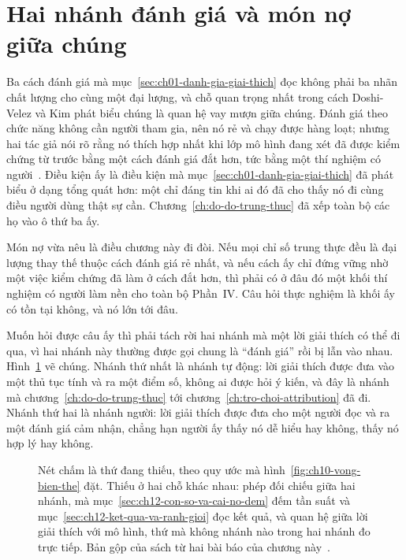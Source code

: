 \section{Hai nhánh đánh giá và món nợ giữa chúng}
\label{sec:ch12-hai-nhanh-danh-gia}

%
%
Ba cách đánh giá mà mục~\ref{sec:ch01-danh-gia-giai-thich} đọc không phải ba
nhãn chất lượng cho cùng một đại lượng, và chỗ quan trọng nhất trong cách
Doshi-Velez và Kim phát biểu chúng là quan hệ vay mượn giữa chúng. Đánh giá
theo chức năng không cần người tham gia, nên nó rẻ và chạy được hàng loạt;
nhưng hai tác giả nói rõ rằng nó thích hợp nhất khi lớp mô hình đang xét đã
được kiểm chứng từ trước bằng một cách đánh giá đắt hơn, tức bằng một thí
nghiệm có người~\autocite{p14rigorous}. Điều kiện ấy là điều kiện mà
mục~\ref{sec:ch01-danh-gia-giai-thich} đã phát biểu ở dạng tổng quát hơn: một
 chỉ đáng tin khi ai đó đã cho thấy nó đi cùng
điều người dùng thật sự cần.
Chương~\ref{ch:do-do-trung-thuc} đã xếp toàn bộ các họ  vào ô
thứ ba ấy.

Món nợ vừa nêu là điều chương này đi đòi. Nếu mọi chỉ số trung thực đều là
đại lượng thay thế thuộc cách đánh giá rẻ nhất, và nếu cách ấy chỉ đứng vững
nhờ một việc kiểm chứng đã làm ở cách đắt hơn, thì phải có ở đâu đó một khối
thí nghiệm có người làm nền cho toàn bộ Phần~IV. Câu hỏi thực nghiệm là khối
ấy có tồn tại không, và nó lớn tới đâu.

%
Muốn hỏi được câu ấy thì phải tách rời hai nhánh mà một lời giải thích có thể
đi qua, vì hai nhánh này thường được gọi chung là \enquote{đánh giá} rồi bị
lẫn vào nhau. Hình~\ref{fig:ch12-hai-nhanh-danh-gia} vẽ chúng. Nhánh thứ nhất
là nhánh tự động: lời giải thích được đưa vào một thủ tục tính và ra một điểm
số, không ai được hỏi ý kiến, và đây là nhánh mà
chương~\ref{ch:do-do-trung-thuc} tới chương~\ref{ch:tro-choi-attribution} đã
đi. Nhánh thứ hai là nhánh người: lời giải thích được đưa cho một người đọc và
ra một đánh giá cảm nhận, chẳng hạn người ấy thấy nó dễ hiểu hay không, thấy
nó hợp lý hay không.

\begin{figure}[htbp]
  \centering
  
  \caption{Nét chấm là thứ đang thiếu, theo quy ước mà
  hình~\ref{fig:ch10-vong-bien-the} đặt. Thiếu ở hai chỗ khác nhau: phép đối
  chiếu giữa hai nhánh, mà mục~\ref{sec:ch12-con-so-va-cai-no-dem} đếm tần
  suất và mục~\ref{sec:ch12-ket-qua-va-ranh-gioi} đọc kết quả, và quan hệ
  giữa lời giải thích với mô hình, thứ mà không nhánh nào trong hai nhánh đo
  trực tiếp. Bản gộp của sách từ hai bài báo của chương
  này~\autocite{p24humangap,p25userperception}.}
  \label{fig:ch12-hai-nhanh-danh-gia}
\end{figure}

